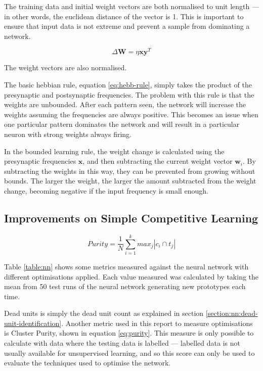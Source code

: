 \documentclass[11pt,journal,transmag,final]{IEEEtran}
\begin{document}
The training data and initial weight vectors are both normalised to unit length --- in other words, the euclidean distance of the vector is 1. This is important to ensure that input data is not extreme and prevent a sample from dominating a network.

\begin{equation}
    \Delta \textbf{W} = \eta \textbf{x} \textbf{y}^{T}
    \label{eq:hebb-rule}
\end{equation}

The weight vectors are also normalised.

The basic hebbian rule, equation \ref{eq:hebb-rule}, simply takes the product of the presynaptic and postsynaptic frequencies. The problem with this rule is that the weights are unbounded. After each pattern seen, the network will increase the weights assuming the frequencies are always positive. This becomes an issue when one particular pattern dominates the network and will result in a particular neuron with strong weights always firing.

In the bounded learning rule, the weight change is calculated using the presynaptic frequencies $\textbf{x}$, and then subtracting the current weight vector $\textbf{w}_i$. By subtracting the weights in this way, they can be prevented from growing without bounds. The larger the weight, the larger the amount subtracted from the weight change, becoming negative if the input frequency is small enough.

\subsection{Improvements on Simple Competitive Learning}

\begin{equation}
    Purity = \frac{1}{N} \sum_{i=1}^{k} max_j | c_i \cap t_j |
    \label{eq:purity}
\end{equation}

Table \ref{table:nn} shows some metrics measured against the neural network with different optimisations applied. Each value measured was calculated by taking the mean from 50 test runs of the neural network generating new prototypes each time.

Dead units is simply the dead unit count as explained in section \ref{section:nn:dead-unit-identification}. Another metric used in this report to measure optimisations is Cluster Purity, shown in equation \ref{eq:purity}\cite{clusterAnalysis}. This measure is only possible to calculate with data where the testing data is labelled --- labelled data is not usually available for unsupervised learning, and so this score can only be used to evaluate the techniques used to optimise the network.
\end{document}
